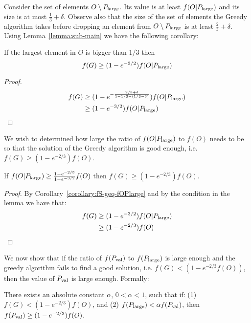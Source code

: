 Consider the set of elements $O \setminus P_{\text{large}}$.
Its value is at least $f(O|P_{\text{large}})$ and its size is at most $\frac{1}{3} + \delta$.
Observe also that the size of the set of elements the Greedy algorithm takes before dropping an element from $O \setminus P_{\text{large}}$ is at least $\frac{2}{3} + \delta$.
Using Lemma~\ref{lemma:sub-main} we have the following corollary:

\begin{corollary}
	\label{corollary:fS-geq-fOPlarge}
	If the largest element in $O$ is bigger than $1/3$ then
	\begin{equation}
		f(G)  \geq (1 - e^{-3/2})f(O|P_{\text{large}})
	\end{equation}
\end{corollary}

\begin{proof}
	\begin{align*}
		f(G) & \geq (1-e^{-\frac{2/3 + \delta}{1 - 1/3 - (1/3 - \delta)}})f(O|P_{\text{large}})
		\\ & \geq (1 - e^{-3/2})f(O|P_{\text{large}})
	\end{align*}
\end{proof}

We wish to determined how large the ratio of $f(O|P_{\text{large}})$ to $f(O)$ needs to be so that the solution of the Greedy algorithm is good enough, i.e. $f(G) \geq (1-e^{-2/3})f(O)$.

\begin{lemma}
	\label{lemma:greedy-good}
	If $f(O|P_{\text{large}}) \geq \frac{1-e^{-2/3}}{1-e^{-3/2}}f(O)$ then $f(G) \geq (1 - e^{-2/3})f(O)$.
\end{lemma}

\begin{proof}
	By Corollary~\ref{corollary:fS-geq-fOPlarge} and by the condition in the lemma we have that:
	\begin{align*}
		f(G)	& \geq (1 - e^{-3/2})f(O|P_{\text{large}})
		\\
				& \geq (1 - e^{-2/3})f(O)
	\end{align*}
\end{proof}

We now show that if the ratio of $f(P_{\text{val}})$ to $f(P_{\text{large}})$ is large enough and the greedy algorithm fails to find a good solution, i.e. $f(G) < (1 - e^{-2/3}f(O))$, then the value of $P_{\text{val}}$ is large enough.
Formally:

\begin{lemma}
	\label{lemma:sub:alpha}
	There exists an absolute constant $\alpha$, $0 < \alpha < 1$, such that if: (1) $f(G) < (1 - e^{-2/3})f(O)$, and (2) $f(P_{\text{large}}) < \alpha f(P_{\text{val}})$, then $f(P_{\text{val}}) \geq (1 - e^{-2/3})f(O)$.
\end{lemma}

